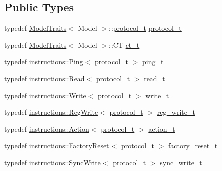 \subsection*{Public Types}
\begin{DoxyCompactItemize}
\item 
typedef \hyperlink{structdynamixel_1_1servos_1_1_model_traits}{Model\+Traits}$<$ Model $>$\+::\hyperlink{classdynamixel_1_1servos_1_1_servo_a7718c41cee1187b992836f4b6bad8a38}{protocol\+\_\+t} \hyperlink{classdynamixel_1_1servos_1_1_servo_a7718c41cee1187b992836f4b6bad8a38}{protocol\+\_\+t}
\item 
typedef \hyperlink{structdynamixel_1_1servos_1_1_model_traits}{Model\+Traits}$<$ Model $>$\+::C\+T \hyperlink{classdynamixel_1_1servos_1_1_servo_a882738edc68b4e641e066954f59896d3}{ct\+\_\+t}
\item 
typedef \hyperlink{classdynamixel_1_1instructions_1_1_ping}{instructions\+::\+Ping}$<$ \hyperlink{classdynamixel_1_1servos_1_1_servo_a7718c41cee1187b992836f4b6bad8a38}{protocol\+\_\+t} $>$ \hyperlink{classdynamixel_1_1servos_1_1_servo_ae6ffa69927b65a1b73a52e80bcd07859}{ping\+\_\+t}
\item 
typedef \hyperlink{classdynamixel_1_1instructions_1_1_read}{instructions\+::\+Read}$<$ \hyperlink{classdynamixel_1_1servos_1_1_servo_a7718c41cee1187b992836f4b6bad8a38}{protocol\+\_\+t} $>$ \hyperlink{classdynamixel_1_1servos_1_1_servo_a456a730b825adc0b7b295f567cf2947b}{read\+\_\+t}
\item 
typedef \hyperlink{classdynamixel_1_1instructions_1_1_write}{instructions\+::\+Write}$<$ \hyperlink{classdynamixel_1_1servos_1_1_servo_a7718c41cee1187b992836f4b6bad8a38}{protocol\+\_\+t} $>$ \hyperlink{classdynamixel_1_1servos_1_1_servo_a4d005c64809a7c1ddf3817ca55ef03c2}{write\+\_\+t}
\item 
typedef \hyperlink{classdynamixel_1_1instructions_1_1_reg_write}{instructions\+::\+Reg\+Write}$<$ \hyperlink{classdynamixel_1_1servos_1_1_servo_a7718c41cee1187b992836f4b6bad8a38}{protocol\+\_\+t} $>$ \hyperlink{classdynamixel_1_1servos_1_1_servo_adb8219ecc5a368a3222cf30cd17bb882}{reg\+\_\+write\+\_\+t}
\item 
typedef \hyperlink{classdynamixel_1_1instructions_1_1_action}{instructions\+::\+Action}$<$ \hyperlink{classdynamixel_1_1servos_1_1_servo_a7718c41cee1187b992836f4b6bad8a38}{protocol\+\_\+t} $>$ \hyperlink{classdynamixel_1_1servos_1_1_servo_ad4d14ab8f1ea33479dce5fc2c7790ded}{action\+\_\+t}
\item 
typedef \hyperlink{classdynamixel_1_1instructions_1_1_factory_reset}{instructions\+::\+Factory\+Reset}$<$ \hyperlink{classdynamixel_1_1servos_1_1_servo_a7718c41cee1187b992836f4b6bad8a38}{protocol\+\_\+t} $>$ \hyperlink{classdynamixel_1_1servos_1_1_servo_abbf04a51c076bfbf234179bb59fd45a2}{factory\+\_\+reset\+\_\+t}
\item 
typedef \hyperlink{classdynamixel_1_1instructions_1_1_sync_write}{instructions\+::\+Sync\+Write}$<$ \hyperlink{classdynamixel_1_1servos_1_1_servo_a7718c41cee1187b992836f4b6bad8a38}{protocol\+\_\+t} $>$ \hyperlink{classdynamixel_1_1servos_1_1_servo_aba1cb665a7f6abd9ba15f10f9264d9c8}{sync\+\_\+write\+\_\+t}
\end{DoxyCompactItemize}
